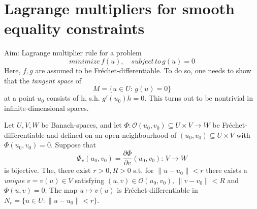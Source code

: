 \section{Lagrange multipliers for smooth equality constraints}\label{section_1.3}
Aim: Lagrange multiplier rule for a problem 
\[
	minimize\,f(u),\quad subject\,to\,g(u) = 0
\]
Here, $f,g$ are assumed to be Fréchet-differentiable. To do so, one needs to show that the \emph{tangent space} of
\[
	M=\{u\in U:\,g(u)=0\}
\]
at a point $u_0$ consists of h, s.h. $g'(u_0)h = 0$. This turns out to be nontrivial in infinite-dimensional spaces.
\begin{theorem}\label{theorem_1.26}
	Let $U,V,W$ be Banach-spaces, and let $\Phi:\mathcal{O}(u_0,v_0)\subseteq U\times V\to W$ %
	be Fréchet-differentiable and defined on an open neighbourhood of $(u_0,v_0)\subseteq U\times V$ with $\Phi(u_0,v_0) = 0$. Suppose that 
	\[
		\Phi_v(u_0,v_0)=\frac{\partial\Phi}{\partial v}(u_0,v_0):\,V\to W
	\]
	is bijective. The, there exist $r>0, R>0$ s.t. for $\|u-u_0\|<r$ there exists a \emph{unique} $v=v(u)\in V$ satisfying $(u,v)\in\mathcal{O}(u_0,v_0),\,\|v-v_0\|<R$ and $\Phi(u,v) = 0$. The map $u\mapsto v(u)$ is Fréchet-differentiable in $N_r=\{u\in U:\|u-u_0\|<r\}$. 
\end{theorem}
